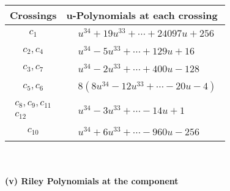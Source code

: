 \documentclass[1p]{elsarticle_modified}
\theoremstyle{definition}
\begin{document}
\begin{tabular}{m{50pt}|m{274pt}}
Crossings & \hspace{64pt}u-Polynomials at each crossing \\
\hline $$\begin{aligned}c_{1}\end{aligned}$$&$\begin{aligned}
&u^{34}+19 u^{33}+\cdots+24097 u+256
\end{aligned}$\\
\hline $$\begin{aligned}c_{2},c_{4}\end{aligned}$$&$\begin{aligned}
&u^{34}-5 u^{33}+\cdots+129 u+16
\end{aligned}$\\
\hline $$\begin{aligned}c_{3},c_{7}\end{aligned}$$&$\begin{aligned}
&u^{34}-2 u^{33}+\cdots+400 u-128
\end{aligned}$\\
\hline $$\begin{aligned}c_{5},c_{6}\end{aligned}$$&$\begin{aligned}
&8(8 u^{34}-12 u^{33}+\cdots-20 u-4)
\end{aligned}$\\
\hline $$\begin{aligned}c_{8},c_{9},c_{11}\\c_{12}\end{aligned}$$&$\begin{aligned}
&u^{34}-3 u^{33}+\cdots-14 u+1
\end{aligned}$\\
\hline $$\begin{aligned}c_{10}\end{aligned}$$&$\begin{aligned}
&u^{34}+6 u^{33}+\cdots-960 u-256
\end{aligned}$\\
\hline
\end{tabular}\\~\\
\newpage\renewcommand{\arraystretch}{1}
\flushleft \textbf{(v) Riley Polynomials at the component}\newline \\
\end{document}
